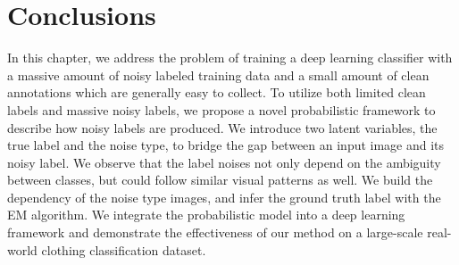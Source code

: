 \section{Conclusions} %
\label{sec:nl-conclusions}
In this chapter, we address the problem of training a deep learning classifier with a massive amount of noisy labeled training data and a small amount of clean annotations which are generally easy to collect. To utilize both limited clean labels and massive noisy labels, we propose a novel probabilistic framework to describe how noisy labels are produced. We introduce two latent variables, the true label and the noise type, to bridge the gap between an input image and its noisy label. We observe that the label noises not only depend on the ambiguity between classes, but could follow similar visual patterns as well. We build the dependency of the noise type \wrt images, and infer the ground truth label with the EM algorithm. We integrate the probabilistic model into a deep learning framework and demonstrate the effectiveness of our method on a large-scale real-world clothing classification dataset.
